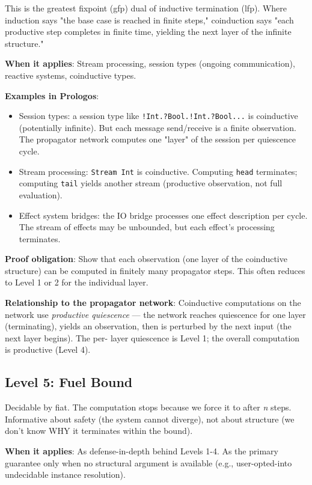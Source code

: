 \documentclass[11pt]{article}
\begin{document}
This is the greatest fixpoint (gfp) dual of inductive termination
(lfp). Where induction says "the base case is reached in finite
steps," coinduction says "each productive step completes in finite
time, yielding the next layer of the infinite structure."

\textbf{When it applies}: Stream processing, session types (ongoing
communication), reactive systems, coinductive types.

\textbf{Examples in Prologos}:
\begin{itemize}
\item Session types: a session type like \texttt{!Int.?Bool.!Int.?Bool...} is
coinductive (potentially infinite). But each message
send/receive is a finite observation. The propagator network
computes one "layer" of the session per quiescence cycle.
\item Stream processing: \texttt{Stream Int} is coinductive. Computing \texttt{head}
terminates; computing \texttt{tail} yields another stream (productive
observation, not full evaluation).
\item Effect system bridges: the IO bridge processes one effect
description per cycle. The stream of effects may be unbounded,
but each effect's processing terminates.
\end{itemize}

\textbf{Proof obligation}: Show that each observation (one layer of the
coinductive structure) can be computed in finitely many propagator
steps. This often reduces to Level 1 or 2 for the individual layer.

\textbf{Relationship to the propagator network}: Coinductive computations
on the network use \emph{productive quiescence} --- the network reaches
quiescence for one layer (terminating), yields an observation, then
is perturbed by the next input (the next layer begins). The per-
layer quiescence is Level 1; the overall computation is productive
(Level 4).
\subsection{Level 5: Fuel Bound}
\label{sec:org3df24c0}

Decidable by fiat. The computation stops because we force it to after
\emph{n} steps. Informative about safety (the system cannot diverge), not
about structure (we don't know WHY it terminates within the bound).

\textbf{When it applies}: As defense-in-depth behind Levels 1-4. As the
primary guarantee only when no structural argument is available (e.g.,
user-opted-into undecidable instance resolution).
\end{document}
